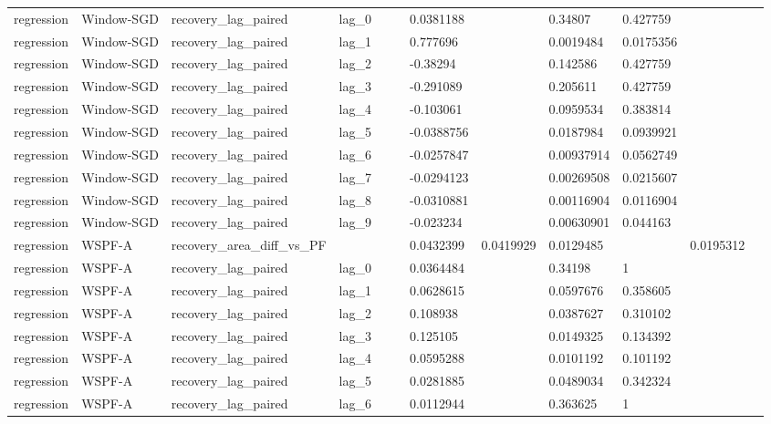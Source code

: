 \begin{tabular}{llllllllllll}
regression & Window-SGD & recovery\_lag\_paired & lag\_0 &  &  & 0.0381188 &  & 0.34807 & 0.427759 &  &  \\
regression & Window-SGD & recovery\_lag\_paired & lag\_1 &  &  & 0.777696 &  & 0.0019484 & 0.0175356 &  &  \\
regression & Window-SGD & recovery\_lag\_paired & lag\_2 &  &  & -0.38294 &  & 0.142586 & 0.427759 &  &  \\
regression & Window-SGD & recovery\_lag\_paired & lag\_3 &  &  & -0.291089 &  & 0.205611 & 0.427759 &  &  \\
regression & Window-SGD & recovery\_lag\_paired & lag\_4 &  &  & -0.103061 &  & 0.0959534 & 0.383814 &  &  \\
regression & Window-SGD & recovery\_lag\_paired & lag\_5 &  &  & -0.0388756 &  & 0.0187984 & 0.0939921 &  &  \\
regression & Window-SGD & recovery\_lag\_paired & lag\_6 &  &  & -0.0257847 &  & 0.00937914 & 0.0562749 &  &  \\
regression & Window-SGD & recovery\_lag\_paired & lag\_7 &  &  & -0.0294123 &  & 0.00269508 & 0.0215607 &  &  \\
regression & Window-SGD & recovery\_lag\_paired & lag\_8 &  &  & -0.0310881 &  & 0.00116904 & 0.0116904 &  &  \\
regression & Window-SGD & recovery\_lag\_paired & lag\_9 &  &  & -0.023234 &  & 0.00630901 & 0.044163 &  &  \\
regression & WSPF-A & recovery\_area\_diff\_vs\_PF &  &  &  & 0.0432399 & 0.0419929 & 0.0129485 &  & 0.0195312 &  \\
regression & WSPF-A & recovery\_lag\_paired & lag\_0 &  &  & 0.0364484 &  & 0.34198 & 1 &  &  \\
regression & WSPF-A & recovery\_lag\_paired & lag\_1 &  &  & 0.0628615 &  & 0.0597676 & 0.358605 &  &  \\
regression & WSPF-A & recovery\_lag\_paired & lag\_2 &  &  & 0.108938 &  & 0.0387627 & 0.310102 &  &  \\
regression & WSPF-A & recovery\_lag\_paired & lag\_3 &  &  & 0.125105 &  & 0.0149325 & 0.134392 &  &  \\
regression & WSPF-A & recovery\_lag\_paired & lag\_4 &  &  & 0.0595288 &  & 0.0101192 & 0.101192 &  &  \\
regression & WSPF-A & recovery\_lag\_paired & lag\_5 &  &  & 0.0281885 &  & 0.0489034 & 0.342324 &  &  \\
regression & WSPF-A & recovery\_lag\_paired & lag\_6 &  &  & 0.0112944 &  & 0.363625 & 1 &  &  \\

\end{tabular}
